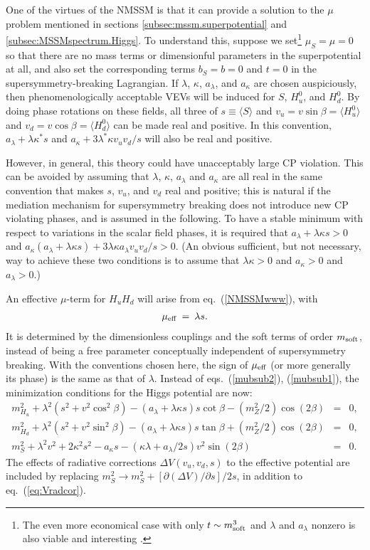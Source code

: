 \documentclass[11pt]{article}
\def\beq{\begin{eqnarray}}
\def\eeq{\end{eqnarray}}
\begin{document}
One of the virtues of the NMSSM is that it can provide a solution to the
$\mu$ problem mentioned in sections \ref{subsec:mssm.superpotential} and
\ref{subsec:MSSMspectrum.Higgs}. To understand this, suppose we
set\footnote{The even more economical case with only $t \sim m_{\rm
soft}^3$ and $\lambda$ and $a_\lambda$ nonzero is also viable and
interesting \cite{nMSSM}.} $\mu_S = \mu = 0$ so that there are no mass
terms or dimensionful parameters in the superpotential at all, and also
set the corresponding terms $b_S = b = 0$ and $t=0$ in the
supersymmetry-breaking Lagrangian.  If 
$\lambda$, $\kappa$, $a_\lambda$, and $a_{\kappa}$ are chosen
auspiciously, then phenomenologically acceptable VEVs will be induced for
$S$, $H_u^0$, and $H_d^0$.  By doing phase rotations on these fields, all
three of $s \equiv \langle S \rangle$ and $v_u = v \sin\beta = \langle
H_u^0 \rangle$ and $v_d = v \cos\beta = \langle H_d^0 \rangle$ can be made
real and positive. In this convention, $a_\lambda + \lambda \kappa^* s$
and $a_{\kappa} + 3 \lambda^* \kappa v_u v_d/s$ will also be real and
positive. 

However, in general, this theory could have unacceptably large CP 
violation. This can be avoided by assuming that $\lambda$, $\kappa$, 
$a_\lambda$ and $a_\kappa$ are all real in the same convention that makes 
$s$, $v_u$, and $v_d$ real and positive; this is natural if the mediation 
mechanism for supersymmetry breaking does not introduce new CP violating 
phases, and is assumed in the following. To have a stable minimum with 
respect to variations in the scalar 
field phases, it is required that $a_\lambda + 
\lambda \kappa s > 0$ and $a_\kappa (a_\lambda + \lambda \kappa s) + 3 
\lambda \kappa a_\lambda v_u v_d/s > 0$. (An obvious sufficient, but not
necessary, way to achieve these two conditions is to assume that 
$\lambda \kappa > 0$ and $a_\kappa>0$ and $a_\lambda > 0$.)

An effective $\mu$-term for $H_u H_d$ will arise from
eq.~(\ref{NMSSMwww}), with \beq \mu_{\rm eff} \>=\> \lambda s. \eeq It is
determined by the dimensionless couplings and the soft terms of order
$m_{\rm soft}$, instead of being a free parameter conceptually independent
of supersymmetry breaking. With the conventions chosen here, the
sign of $\mu_{\rm eff}$ (or more generally its phase) is the same as that
of $\lambda$. Instead of eqs.~(\ref{mubsub2}), (\ref{mubsub1}), the
minimization conditions for the Higgs potential are now: 
\beq
m^2_{H_u} + \lambda^2 (s^2 + v^2 \cos^2\beta) 
- (a_\lambda + \lambda \kappa s) s \cot\beta
- (m_Z^2/2) \cos(2\beta) &=& 0,
\\
m^2_{H_d} + \lambda^2 (s^2 + v^2 \sin^2\beta) 
-(a_\lambda + \lambda \kappa s) s \tan\beta
+ (m_Z^2/2) \cos(2\beta) &=& 0,
\\
m^2_{S} + \lambda^2 v^2 + 2 \kappa^2 s^2 - a_\kappa s
-(\kappa\lambda  + a_\lambda/2 s) v^2 \sin(2\beta) &=& 0.
\eeq
The effects of radiative corrections $\Delta V(v_u,v_d,s)$ to the
effective potential are included by replacing $m_S^2 \rightarrow m_S^2 +
[\partial (\Delta V)/\partial s]/2s$, in addition to
eq.~(\ref{eq:Vradcor}). 
\end{document}
